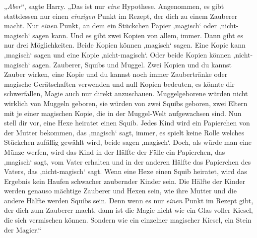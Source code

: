 „\emph{Aber}“, sagte Harry. „Das ist nur \emph{eine} Hypothese. Angenommen, es gibt stattdessen nur einen \emph{einzigen} Punkt im Rezept, der dich zu einem Zauberer macht. Nur \emph{einen} Punkt, an dem ein Stückchen Papier ‚magisch‘ oder ‚nicht-magisch‘ sagen kann. Und es gibt zwei Kopien von allem, immer. Dann gibt es nur drei Möglichkeiten. Beide Kopien können ‚magisch‘ sagen. Eine Kopie kann ‚magisch‘ sagen und eine Kopie ‚nicht-magisch‘. Oder beide Kopien können ‚nicht-magisch‘ sagen. Zauberer, Squibs und Muggel. Zwei Kopien und du kannst Zauber wirken, eine Kopie und du kannst noch immer Zaubertränke oder magische Gerätschaften verwenden und null Kopien bedeuten, es könnte dir schwerfallen, Magie auch nur direkt anzuschauen. Muggelgeborene würden nicht wirklich von Muggeln geboren, sie würden von zwei Squibs geboren, zwei Eltern mit je einer magischen Kopie, die in der Muggel-Welt aufgewachsen sind. Nun stell dir vor, eine Hexe heiratet einen Squib. Jedes Kind wird ein Papierchen von der Mutter bekommen, das ‚magisch‘ sagt, immer, es spielt keine Rolle welches Stückchen zufällig gewählt wird, beide sagen ‚magisch‘. Doch, als würde man eine Münze werfen, wird das Kind in der Hälfte der Fälle ein Papierchen, das ‚magisch‘ sagt, vom Vater erhalten und in der anderen Hälfte das Papierchen des Vaters, das ‚nicht-magisch‘ sagt. Wenn eine Hexe einen Squib heiratet, wird das Ergebnis kein Haufen schwacher zaubernder Kinder sein. Die Hälfte der Kinder werden genauso mächtige Zauberer und Hexen sein, wie ihre Mutter und die andere Hälfte werden Squibs sein. Denn wenn es nur \emph{einen} Punkt im Rezept gibt, der dich zum Zauberer macht, dann ist die Magie nicht wie ein Glas voller Kiesel, die sich vermischen können. Sondern wie ein einzelner magischer Kiesel, ein Stein der Magier.“%

